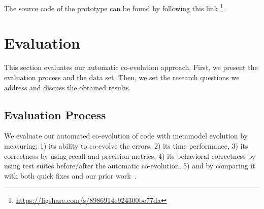 	The source code of the prototype can be found by following this link \footnote{\url{https://figshare.com/s/8986914e924300be77da}}.
	
	
	\section{Evaluation}\label{eval}
	
	This section evaluates our automatic co-evolution approach. 
	First, we present the evaluation process and the data set. Then, we set the research questions we address and discuss the obtained results.
	
	
	\subsection{Evaluation Process}
	
	We evaluate our automated co-evolution of code with metamodel evolution by measuring: 1) its ability to co-evolve the errors, 2) its time performance, 3) its correctness by using recall and precision metrics, 4) its behavioral correctness by using test suites before/after the automatic co-evolution, 5) and by comparing it with both quick fixes and our prior work~\cite{Khelladi2020}. %
	
